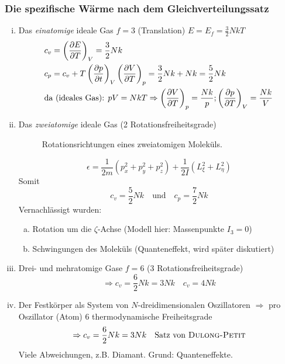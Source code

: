 \subsubsection{Die spezifische Wärme nach dem Gleichverteilungssatz}
\begin{enumerate}[i)]
    \item Das \emph{einatomige} ideale Gas $f=3$ (Translation) $E = E_f = \frac{3}{2} N k T$
    \begin{equation}
        \begin{split}
            & c_v = \left( \frac{\partial E}{\partial T} \right)_{V} = \frac{3}{2} N k \\
            & c_p = c_v + T \left( \frac{\partial p}{\partial t} \right)_{V} \left( \frac{\partial V}{\partial T} \right)_{p} = \frac{3}{2} N k + N k = \frac{5}{2} N k \\
            & \text{da (ideales Gas): } pV = N k T \Rightarrow \left( \frac{\partial V}{\partial T} \right)_{p} = \frac{N k }{p}; \left( \frac{\partial p}{\partial T} \right)_{V} = \frac{N k}{V}
        \end{split}
    \end{equation}
    \item Das \emph{zweiatomige} ideale Gas (2 Rotationsfreiheitsgrade)

\begin{figure}[H]
        \centering
        \def\svgwidth{0.5\textwidth}
        
        \caption{Rotationsrichtungen eines zweiatomigen Moleküls.}
        \label{img:2atomicGasRotationDirections}
\end{figure}

    \begin{equation}
        \epsilon = \frac{1}{2 m} \left( p_x^2 + p_y^2 + p_z^2 \right) + \frac{1}{2 I} \left( L_\xi^2 + L_\eta^2 \right)
    \end{equation}
    Somit
    \begin{equation}
        c_v = \frac{5}{2} N k \quad \text{und} \quad c_p = \frac{7}{2} N k
    \end{equation}
    Vernachlässigt wurden:
    \begin{enumerate}[a)]
        \item Rotation um die $\zeta$-Achse (Modell hier: Massenpunkte $I_3 = 0$)
        \item Schwingungen des Moleküls (Quanteneffekt, wird später diskutiert)
    \end{enumerate}
    \item Drei- und mehratomige Gase $f = 6$ (3 Rotationsfreiheitsgrade)
    \begin{equation}
        \Rightarrow c_v = \frac{6}{2} N k = 3 N k \quad c_v = 4 N k
    \end{equation}
    \item Der Festkörper als System von $N$-dreidimensionalen Oszillatoren $\Rightarrow$ pro Oszillator (Atom) 6 thermodynamische Freiheitsgrade
    \begin{equation}
        \Rightarrow c_v = \frac{6}{2} N k = 3 N k \quad \text{Satz von \textsc{Dulong-Petit}}
    \end{equation}
    Viele Abweichungen, z.B. Diamant. Grund: Quanteneffekte.
\end{enumerate}
